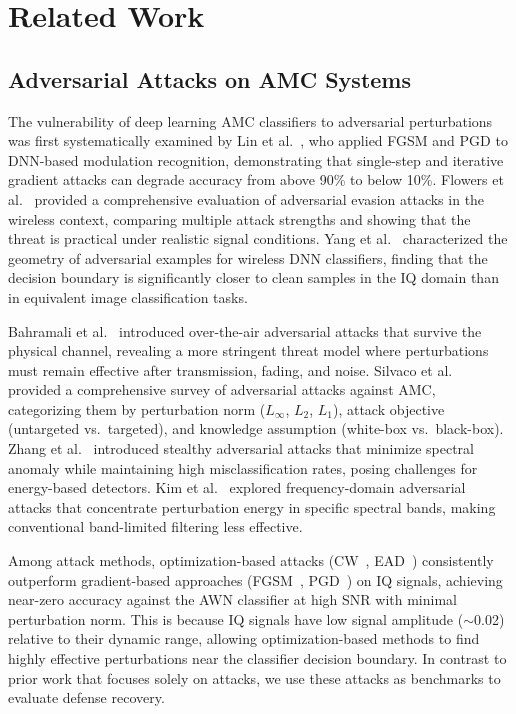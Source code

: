 \section{Related Work}
\label{sec:related}

\subsection{Adversarial Attacks on AMC Systems}

The vulnerability of deep learning AMC classifiers to adversarial perturbations was
first systematically examined by Lin et al.~\cite{lin2020tactics}, who applied FGSM
and PGD to DNN-based modulation recognition, demonstrating that single-step and
iterative gradient attacks can degrade accuracy from above 90\% to below 10\%.
Flowers et al.~\cite{flowers2019sigguard} provided a comprehensive evaluation of
adversarial evasion attacks in the wireless context, comparing multiple attack
strengths and showing that the threat is practical under realistic signal
conditions. Yang et al.~\cite{yang2018characterizing} characterized the geometry
of adversarial examples for wireless DNN classifiers, finding that the decision
boundary is significantly closer to clean samples in the IQ domain than in
equivalent image classification tasks.

Bahramali et al.~\cite{bahramali2021robust} introduced over-the-air adversarial
attacks that survive the physical channel, revealing a more stringent threat
model where perturbations must remain effective after transmission, fading, and
noise. Silvaco et al.~\cite{silvaco2023adversarial_rf} provided a comprehensive
survey of adversarial attacks against AMC, categorizing them by perturbation norm
($L_\infty$, $L_2$, $L_1$), attack objective (untargeted vs.\ targeted), and
knowledge assumption (white-box vs.\ black-box). Zhang et al.~\cite{zhang2024stealthy}
introduced stealthy adversarial attacks that minimize spectral anomaly while
maintaining high misclassification rates, posing challenges for energy-based
detectors. Kim et al.~\cite{kim2024frequency} explored frequency-domain
adversarial attacks that concentrate perturbation energy in specific spectral
bands, making conventional band-limited filtering less effective.

Among attack methods, optimization-based attacks (CW~\cite{carlini2017towards},
EAD~\cite{chen2020ead}) consistently outperform gradient-based approaches
(FGSM~\cite{goodfellow2015fgsm}, PGD~\cite{madry2018pgd}) on IQ signals,
achieving near-zero accuracy against the AWN classifier at high SNR with minimal
perturbation norm. This is because IQ signals have low signal amplitude ($\sim$0.02)
relative to their dynamic range, allowing optimization-based methods to find
highly effective perturbations near the classifier decision boundary. In contrast
to prior work that focuses solely on attacks, we use these attacks as benchmarks
to evaluate defense recovery.

